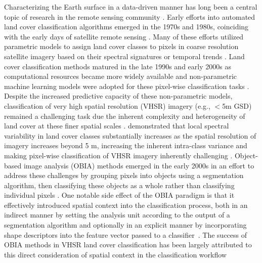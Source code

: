 Characterizing the Earth surface in a data-driven manner has long been a central topic of research in the remote sensing community \citep{andersonLanduseClassificationSchemes1971, cihlarLandCoverMapping2000, friedlGlobalLandCover2002, phiriDevelopmentsLandsatLand2017, zhaoComparisonThreeMachine2024}.
Early efforts into automated land cover classification algorithms emerged in the 1970s and 1980s, coinciding with the early days of satellite remote sensing \citep{tuckerAfricanLandCoverClassification1985,andersonLandUseLand1976,byrneMonitoringLandcoverChange1980}.
Many of these efforts utilized parametric models to assign land cover classes to pixels in coarse resolution satellite imagery based on their spectral signatures or temporal trends \citep{defriesNDVIderivedLandCover1994,jensenSpectralTexturalFeatures1979,townshendCharacterizationClassificationSouth1987, marceauEvaluationGreylevelCooccurrence1990}.
Land cover classification methods matured in the late 1990s and early 2000s as computational resources became more widely available and non-parametric machine learning models were adopted for these pixel-wise classification tasks \citep{brodleyDecisionTreeClassification1997, friedlMODISCollection52010, palRandomForestClassifier2005,lovelandDevelopmentGlobalLand2000, huangAssessmentSupportVector2002}.
Despite the increased predictive capacity of these non-parametric models, classification of very high spatial resolution (VHSR) imagery (e.g., \(<\)5m GSD) remained a challenging task due the inherent complexity and heterogeneity of land cover at these finer spatial scales \citep{tongLandcoverClassificationHighresolution2020}.
\citet{woodcockFactorScaleRemote1987} demonstrated that local spectral variability in land cover classes substantially increases as the spatial resolution of imagery increases beyond 5 m, increasing the inherent intra-class variance and making pixel-wise classification of VHSR imagery inherently challenging \citep{cleveClassificationWildlandUrban2008}.
Object-based image analysis (OBIA) methods emerged in the early 2000s in an effort to address these challenges by grouping pixels into objects using a segmentation algorithm, then classifying these objects as a whole rather than classifying individual pixels \citep{blaschkeObjectOrientedImageProcessing2000a, blaschkeObjectBasedImage2010}.
One notable side effect of the OBIA paradigm is that it effectively introduced spatial context into the classification process, both in an indirect manner by setting the analysis unit according to the output of a segmentation algorithm and optionally in an explicit manner by incorporating shape descriptors into the feature vector passed to a classifier~\citep{blaschkeGeographicObjectBasedImage2014a, yeReviewAccuracyAssessment2018}.
The success of OBIA methods in VHSR land cover classification has been largely attributed to this direct consideration of spatial context in the classification workflow~\citep{balhaComparativeAnalysisDifferent2021}

